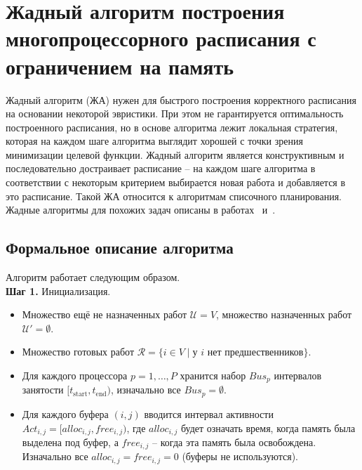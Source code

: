 \section{Жадный алгоритм построения многопроцессорного расписания с ограничением на память}
\label{sec:3_greedy_algos} 

Жадный алгоритм (ЖА) нужен для быстрого построения корректного расписания на основании некоторой эвристики. При этом не гарантируется оптимальность построенного расписания, но в основе алгоритма лежит локальная стратегия, которая на каждом шаге алгоритма выглядит хорошей с точки зрения минимизации целевой функции. Жадный алгоритм является конструктивным и последовательно достраивает расписание -- на каждом шаге алгоритма в соответствии с некоторым критерием выбирается новая работа и добавляется в это расписание. Такой ЖА относится к алгоритмам списочного планирования. Жадные алгоритмы для похожих задач описаны в работах~\cite{Savitsky2023} и~\cite{BalashovKostenko2023}.

\subsection{Формальное описание алгоритма}

Алгоритм работает следующим образом.\\

\textbf{Шаг 1.} Инициализация. 
\begin{itemize}
	\item Множество ещё не назначенных работ $\mathcal{U} = V$, множество назначенных работ $\mathcal{U'} = \emptyset$.
	\item Множество готовых работ $\mathcal{R} = \{ i \in V \mid \text{у } i \text{ нет предшественников} \}$.
	\item Для каждого процессора $p = 1,\dots,P$ хранится набор $Bus_p$ интервалов занятости $[t_{\text{start}}, t_{\text{end}})$, изначально все $Bus_p = \emptyset$.
	\item Для каждого буфера $(i, j)$ вводится интервал активности $Act_{i, j} = [alloc_{i, j}, free_{i, j})$, где $alloc_{i, j}$ будет означать время, когда память была выделена под буфер, а  $free_{i, j}$ -- когда эта память была освобождена. Изначально все $alloc_{i, j} =  free_{i, j} = 0$ (буферы не используются).\\\\\\\\
\end{itemize}

